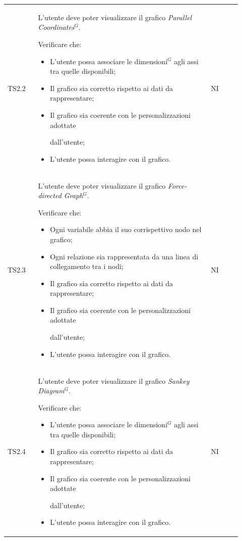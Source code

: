 \begin{longtable}{p{0.12\linewidth}p{0.68\linewidth}p{0.12\linewidth}}
    \rowcolor[RGB]{216, 235, 171}
    TS2.2 &
    L'utente deve poter visualizzare il grafico \textit{Parallel Coordinates}$^{G}$.
    \par Verificare che:
    \begin{itemize}
        \item L'utente possa associare le dimensioni$^{G}$ agli assi tra quelle disponibili;
        \item Il grafico sia corretto rispetto ai dati da rappresentare;
        \item Il grafico sia coerente con le personalizzazioni adottate \par dall'utente;
        \item L'utente possa interagire con il grafico.
    \end{itemize}&
    NI\\

    \rowcolor[RGB]{233, 245, 206}
    TS2.3 &
    L'utente deve poter visualizzare il grafico \textit{Force-directed Graph}$^{G}$.
    \par Verificare che:
    \begin{itemize}
        \item Ogni variabile abbia il suo corrispettivo nodo nel grafico;
        \item Ogni relazione sia rappresentata da una linea di collegamento tra i
        nodi;        
        \item Il grafico sia corretto rispetto ai dati da rappresentare;
        \item Il grafico sia coerente con le personalizzazioni adottate \par dall'utente;
        \item L'utente possa interagire con il grafico.
    \end{itemize}&
    NI\\

    \rowcolor[RGB]{216, 235, 171}
    TS2.4 &
    L'utente deve poter visualizzare il grafico \textit{Sankey Diagram}$^{G}$.
    \par Verificare che:
    \begin{itemize}
        \item L'utente possa associare le dimensioni$^{G}$ agli assi tra quelle disponibili;
        \item Il grafico sia corretto rispetto ai dati da rappresentare;
        \item Il grafico sia coerente con le personalizzazioni adottate \par dall'utente;
        \item L'utente possa interagire con il grafico.
    \end{itemize}&
    NI\\


\end{longtable}

